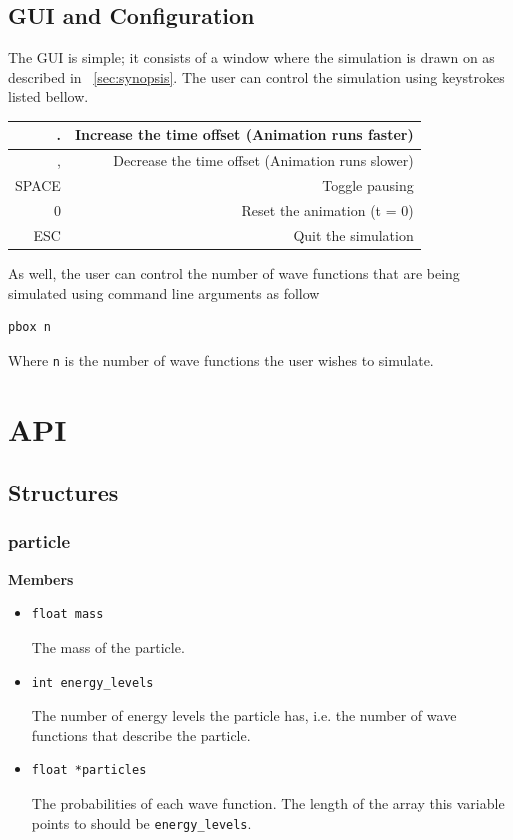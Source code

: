 \documentclass[a4paper, 10pt]{article}
\begin{document}
    \subsection{GUI and Configuration}
    The GUI is simple; it consists of a window where the simulation is drawn on
    as described in ~\ref{sec:synopsis}. The user can control the simulation using keystrokes listed bellow.
    \begin{center}
        \begin{tabular}{|r|r|}
        \hline
            . & Increase the time offset (Animation runs faster) \\ \hline
            , & Decrease the time offset (Animation runs slower) \\ \hline
            SPACE & Toggle pausing \\ \hline
            0 & Reset the animation (t = 0) \\ \hline
            ESC & Quit the simulation \\ \hline
        \end{tabular}
    \end{center}
    As well, the user can control the number of wave functions that are being simulated using
    command line arguments as follow
    \begin{verbatim}pbox n\end{verbatim}
    Where \verb|n| is the number of wave functions the user wishes to simulate.

\newpage
\section{API}
    \subsection{Structures}
        \subsubsection{particle}
        {\bf Members}
        \begin{itemize}
            \item \begin{verbatim}float mass\end{verbatim} The mass of the particle.
            \item \begin{verbatim}int energy_levels\end{verbatim} The number
                  of energy levels the particle has, i.e. the number of wave
                  functions that describe the particle.
            \item \begin{verbatim}float *particles\end{verbatim} The
                  probabilities of each wave function. The length of the array
                  this variable points to should be \verb|energy_levels|.
        \end{itemize}
\end{document}
